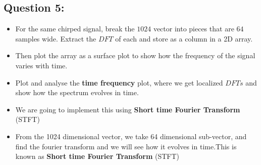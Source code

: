 \documentclass[11pt, a4paper]{article}
\begin{document}
\subsection{Question 5:}\label{question-6}

\begin{itemize}

\item
  For the same chirped signal, break the \(1024\) vector into pieces
  that are \(64\) samples wide. Extract the \(DFT\) of each and store as
  a column in a 2D array.
\item
  Then plot the array as a surface plot to show how the frequency of the
  signal varies with time.
\item
  Plot and analyse the \textbf{time frequency} plot, where we get
  localized \(DFTs\) and show how the spectrum evolves in time.
\item 
We are going to implement this using \textbf{Short time Fourier Transform} (STFT)  
\item
  From the 1024 dimensional vector, we take 64 dimensional sub-vector,
  and find the fourier transform and we will see how it evolves in
  time.This is known as \textbf{Short time Fourier Transform} (STFT)
\end{itemize}
\end{document}
